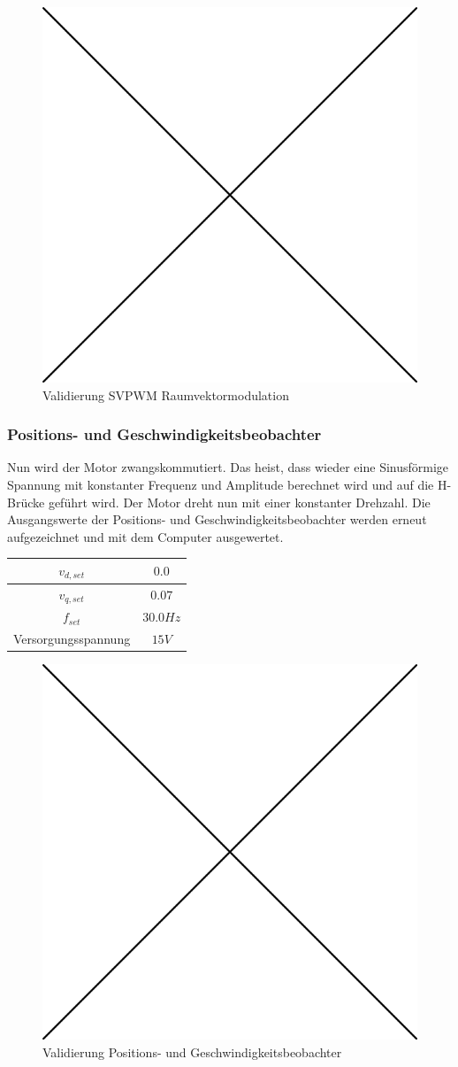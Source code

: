 \begin{figure} [H]
	\centering
	\includegraphics[width=0.5\linewidth]{images/placeholder.png}
	\caption{Validierung SVPWM Raumvektormodulation}
	\label{fig:svpwm}
\end{figure}

\subsubsection*{Positions- und Geschwindigkeitsbeobachter} \label{val:obs}
Nun wird der Motor zwangskommutiert. Das heist, dass wieder eine Sinusförmige Spannung mit konstanter Frequenz und Amplitude berechnet wird und auf die H-Brücke geführt wird. Der Motor dreht nun mit einer konstanter Drehzahl. Die Ausgangswerte der Positions- und Geschwindigkeitsbeobachter werden erneut aufgezeichnet und mit dem Computer ausgewertet.

\begin{center}
	\begin{tabular}{|c|c|}
		\hline 
		$v_{d,set}$ & $0.0$ \\ \hline
		$v_{q,set}$ & $0.07$ \\ \hline
		$f_{set}$ & $30.0Hz$ \\ \hline
		Versorgungsspannung & $15V$ \\ \hline
	\end{tabular} 
	\label{tab:obsmessbed}
\end{center}

\begin{figure} [H]
	\centering
	\includegraphics[width=0.5\linewidth]{images/placeholder.png}
	\caption{Validierung Positions- und Geschwindigkeitsbeobachter}
	\label{fig:observer}
\end{figure}

